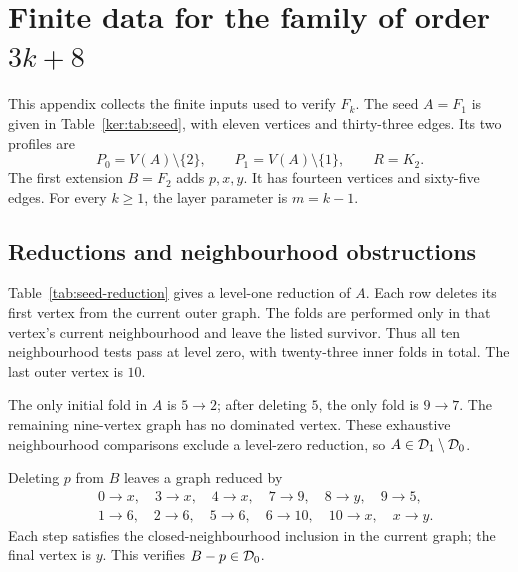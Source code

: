 \section{Finite data for the family of order \texorpdfstring{$3k+8$}{3k+8}}\label{sec:article}\label{sec:example}\label{sec:seed3k8}
This appendix collects the finite inputs used to verify $F_k$. The seed
$A=F_1$ is given in Table~\ref{ker:tab:seed}, with eleven vertices and thirty-three edges.
Its two profiles are
\begin{equation}\label{eq:seed-profiles}
 P_0=V(A)\setminus\{2\},\qquad P_1=V(A)\setminus\{1\},\qquad R=K_2.
\end{equation}
The first extension $B=F_2$ adds $p,x,y$. It has fourteen vertices and
sixty-five edges. For every $k\geq1$, the layer parameter is $m=k-1$.

\subsection{Reductions and neighbourhood obstructions}
Table~\ref{tab:seed-reduction} gives a level-one reduction of $A$. Each row
deletes its first vertex from the current outer graph. The folds are performed
only in that vertex's current neighbourhood and leave the listed survivor.
Thus all ten neighbourhood tests pass at level zero, with twenty-three inner
folds in total. The last outer vertex is $10$.
\begin{table}[htbp]
\centering\small\setlength{\tabcolsep}{4pt}
\caption{The level-one reduction of the eleven-vertex seed.}\label{tab:seed-reduction}

\end{table}
The only initial fold in $A$ is $5\to2$; after deleting $5$, the only fold is
$9\to7$. The remaining nine-vertex graph has no dominated vertex. These
exhaustive neighbourhood comparisons exclude a level-zero reduction, so
$A\in\mathcal D_1\setminus\mathcal D_0$.

Deleting $p$ from $B$ leaves a graph reduced by
\begin{equation}\label{eq:seed-rest-folds}
\begin{aligned}
&0\to x,\quad3\to x,\quad4\to x,\quad7\to9,\quad8\to y,\quad9\to5,\\
&1\to6,\quad2\to6,\quad5\to6,\quad6\to10,\quad10\to x,\quad x\to y.
\end{aligned}
\end{equation}
Each step satisfies the closed-neighbourhood inclusion in the current graph;
the final vertex is $y$. This verifies $B-p\in\mathcal D_0$.

